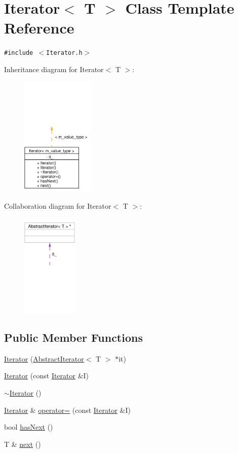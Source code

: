 \hypertarget{classIterator}{
\section{Iterator$<$ T $>$ Class Template Reference}
\label{classIterator}
}
{\tt \#include $<$Iterator.h$>$}

Inheritance diagram for Iterator$<$ T $>$:\begin{figure}[H]
\begin{center}
\leavevmode
\includegraphics[width=99pt]{classIterator__inherit__graph}
\end{center}
\end{figure}
Collaboration diagram for Iterator$<$ T $>$:\begin{figure}[H]
\begin{center}
\leavevmode
\includegraphics[width=75pt]{classIterator__coll__graph}
\end{center}
\end{figure}
\subsection*{Public Member Functions}
\begin{CompactItemize}
\item 
\hyperlink{classIterator_a0}{Iterator} (\hyperlink{classAbstractIterator}{Abstract\-Iterator}$<$ T $>$ $\ast$it)
\item 
\hyperlink{classIterator_a1}{Iterator} (const  \hyperlink{classIterator}{Iterator} \&I)
\item 
\hyperlink{classIterator_a2}{$\sim$Iterator} ()
\item 
\hyperlink{classIterator}{Iterator} \& \hyperlink{classIterator_a3}{operator=} (const  \hyperlink{classIterator}{Iterator} \&I)
\item 
bool \hyperlink{classIterator_a4}{has\-Next} ()
\item 
T \& \hyperlink{classIterator_a5}{next} ()
\end{CompactItemize}
